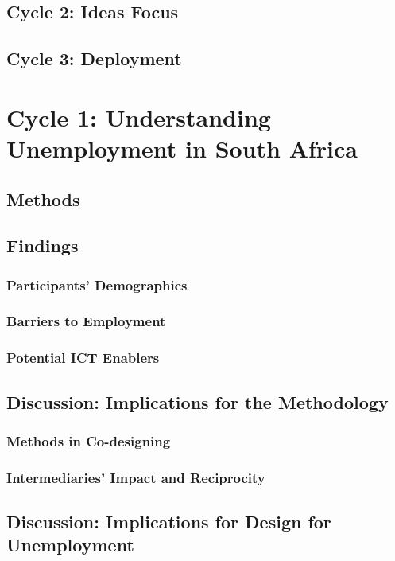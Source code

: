 \documentclass[12pt,a4paper,oneside]{report}
\begin{document}
\section{Cycle 2: Ideas Focus}

\section{Cycle 3: Deployment}


\chapter{Cycle 1: Understanding Unemployment in South Africa}

\section{Methods}

\section{Findings}
\subsection{Participants’ Demographics}
\subsection{Barriers to Employment}
\subsection{Potential ICT Enablers}

\section{Discussion: Implications for the Methodology}
\subsection{Methods in Co-designing}
\subsection{Intermediaries’ Impact and Reciprocity}

\section{Discussion: Implications for Design for Unemployment}
\end{document}
